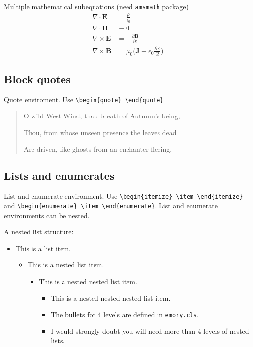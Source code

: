 \documentclass[draft]{emory}
\begin{document}
Multiple mathematical subequations (need \Verb|amsmath| package)
\begin{subequations}\label{math:sub}
\begin{align}
  \nabla\cdot\pmb{E}&=\frac{\rho}{\epsilon_0} \label{math:sub1}\\
  \nabla\cdot\pmb{B}&=0 \label{math:sub2} \\
  \nabla\times\pmb{E}&=-\frac{\partial\pmb{B}}{\partial t} \label{math:sub3}\\
  \nabla\times\pmb{B}&=\mu_0\Big(\pmb{J}+\epsilon_0\frac{\partial\pmb{E}}{\partial t}\Big) \label{math:sub4}
\end{align}
\end{subequations}

\subsection{Block quotes}
Quote enviroment. Use \Verb|\begin{quote} \end{quote}|

\begin{quote}\label{poet}
O wild West Wind, thou breath of Autumn's being,

Thou, from whose unseen presence the leaves dead

Are driven, like ghosts from an enchanter fleeing,
\end{quote}

\subsection{Lists and enumerates}
List and enumerate environment. Use \Verb|\begin{itemize} \item \end{itemize}|
and \Verb|\begin{enumerate} \item \end{enumerate}|. List and enumerate 
environments
can be nested.

A nested list structure:
\begin{itemize}
  \item This is a list item.
  \begin{itemize}
    \item This is a nested list item.
    \begin{itemize}
      \item This is a nested nested list item.
      \begin{itemize}
        \item This is a nested nested nested list item. 
        \item The bullets for 4 levels are defined in \Verb|emory.cls|.
        \item I would strongly doubt you will need more than 4 levels of nested lists.
      \end{itemize}
    \end{itemize}
  \end{itemize}    
\end{itemize}
\end{document}
